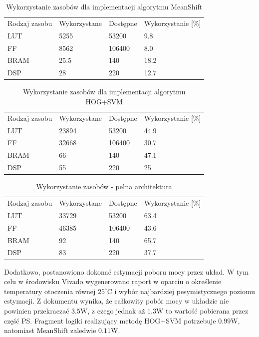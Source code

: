 \begin{table}[ht]
	\centering
	\caption{Wykorzystanie zasobów dla implementacji algorytmu MeanShift}
	\captionsetup{justification=centering,margin=1cm}
	\begin{tabular}{|P{3cm} |P{3cm} |P{3cm}|P{4cm}|}	
		\hline
		 Rodzaj zasobu & Wykorzystane & Dostępne & Wykorzystanie [\%]\\ 
		LUT		& 5255	& 53200 & 9.8\\ 
		\hline
		FF		& 8562	& 106400 & 8.0\\ 
		\hline
		BRAM	& 25.5	& 140 & 18.2\\ 
		\hline
		DSP		& 28	& 220 & 12.7\\ 
		\hline		
	\end{tabular}

	\label{tab:utilizationMS}
\end{table}

\begin{table}[ht]
	\centering
	\caption{Wykorzystanie zasobów dla implementacji algorytmu HOG+SVM}
	\captionsetup{justification=centering,margin=1cm}
	\begin{tabular}{|P{3cm} |P{3cm} |P{3cm}|P{4cm}|}	
		\hline
		 Rodzaj zasobu & Wykorzystane & Dostępne & Wykorzystanie [\%]\\ 
		LUT		& 23894	& 53200 & 44.9\\ 
		\hline
		FF		& 32668	& 106400 & 30.7\\ 
		\hline
		BRAM	& 66	& 140 & 47.1\\ 
		\hline
		DSP		& 55	& 220 & 25\\ 
		\hline		
	\end{tabular}
	\label{tab:utilizationHOG}
\end{table}

\begin{table}[ht]
	\centering
	\caption{Wykorzystanie zasobów - pełna architektura}	
	\captionsetup{justification=centering,margin=1cm}
	\begin{tabular}{|P{3cm} |P{3cm} |P{3cm}|P{4cm}|}	
		\hline
		 Rodzaj zasobu & Wykorzystane & Dostępne & Wykorzystanie [\%]\\ 
		LUT		& 33729	& 53200 & 63.4\\ 
		\hline
		FF		& 46385	& 106400 & 43.6\\ 
		\hline
		BRAM	& 92	& 140 & 65.7\\ 
		\hline
		DSP		& 83	& 220 & 37.7\\ 
		\hline		
	\end{tabular}
	\label{tab:utilizationOverall}
\end{table} 

Dodatkowo, postanowiono dokonać estymacji poboru mocy przez układ. 
W tym celu w środowisku Vivado wygenerowano raport w oparciu o określenie temperatury otoczenia równej $25^{\circ}$C i wybór najbardziej pesymistycznego poziomu estymacji. 
Z dokumentu wynika, że całkowity pobór mocy w układzie nie powinien przekraczać $3.5$W, z czego jednak aż $1.3$W to wartość pobierana przez część PS. 
Fragment logiki realizujący metodę HOG+SVM potrzebuje $0.99$W, natomiast MeanShift zaledwie $0.11$W.